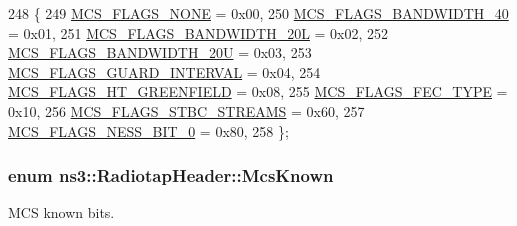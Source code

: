 \begin{DoxyCode}
248   \{
249     \hyperlink{classns3_1_1RadiotapHeader_a81a58a7c4281df7ce21fb72c5ed181c3a67178ec6513d916afcecb853ff28879a}{MCS\_FLAGS\_NONE}           = 0x00, 
250     \hyperlink{classns3_1_1RadiotapHeader_a81a58a7c4281df7ce21fb72c5ed181c3ab773f6bda0fb799641002df6fa7999b3}{MCS\_FLAGS\_BANDWIDTH\_40}   = 0x01, 
251     \hyperlink{classns3_1_1RadiotapHeader_a81a58a7c4281df7ce21fb72c5ed181c3a41b3a5b0829e5d74481b29e10bb9b62b}{MCS\_FLAGS\_BANDWIDTH\_20L}  = 0x02, 
252     \hyperlink{classns3_1_1RadiotapHeader_a81a58a7c4281df7ce21fb72c5ed181c3af81c202c7a382ad9aef708cf2ce35fc3}{MCS\_FLAGS\_BANDWIDTH\_20U}  = 0x03, 
253     \hyperlink{classns3_1_1RadiotapHeader_a81a58a7c4281df7ce21fb72c5ed181c3acc0e1e46ecea2243688341d5aa31fbb1}{MCS\_FLAGS\_GUARD\_INTERVAL} = 0x04, 
254     \hyperlink{classns3_1_1RadiotapHeader_a81a58a7c4281df7ce21fb72c5ed181c3ac8c45b1a0c60f92bf2f424f46373c87c}{MCS\_FLAGS\_HT\_GREENFIELD}  = 0x08, 
255     \hyperlink{classns3_1_1RadiotapHeader_a81a58a7c4281df7ce21fb72c5ed181c3aaed90d8ffcd9188b689b67d64d24d7dc}{MCS\_FLAGS\_FEC\_TYPE}       = 0x10, 
256     \hyperlink{classns3_1_1RadiotapHeader_a81a58a7c4281df7ce21fb72c5ed181c3a9d8a68f5220ee2e53e48ebb9f140103b}{MCS\_FLAGS\_STBC\_STREAMS}   = 0x60, 
257     \hyperlink{classns3_1_1RadiotapHeader_a81a58a7c4281df7ce21fb72c5ed181c3a423ea5081ba934fb09932a665e19328e}{MCS\_FLAGS\_NESS\_BIT\_0}     = 0x80, 
258   \};
\end{DoxyCode}
\subsubsection[{\texorpdfstring{Mcs\+Known}{McsKnown}}]{\setlength{\rightskip}{0pt plus 5cm}enum {\bf ns3\+::\+Radiotap\+Header\+::\+Mcs\+Known}}\hypertarget{classns3_1_1RadiotapHeader_aac7ef91c429fa95640a0e3a996b6741d}{}\label{classns3_1_1RadiotapHeader_aac7ef91c429fa95640a0e3a996b6741d}


M\+CS known bits. 

